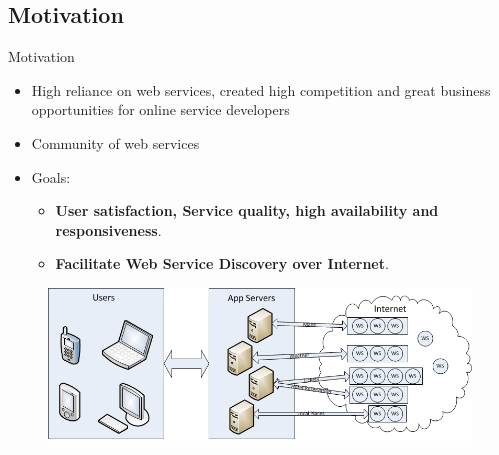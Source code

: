 \documentclass{beamer}
\begin{document}
\subsection{Motivation}
    \begin{frame}{Motivation}
    \begin{itemize}
        \item High reliance on web services, created high competition and great business opportunities for online service developers
        \item Community of web services
        \item Goals:
        \begin{itemize}
            \item \textbf{User satisfaction, Service quality, high availability and responsiveness}.
            \item \textbf{Facilitate Web Service Discovery over Internet}.
        \end{itemize}
    \end{itemize}
    \begin{figure}[htbp]
        \centering
        \includegraphics[width=1.0 \columnwidth]{figures/wsinternet.png}
    \end{figure}
    \end{frame}
\end{document}
